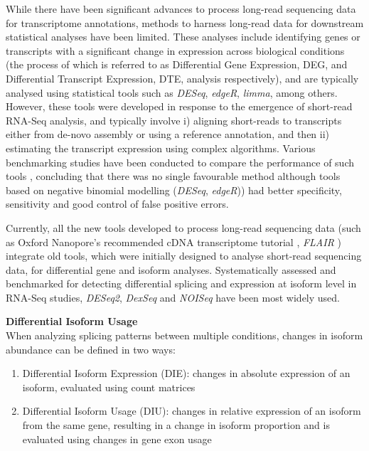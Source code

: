 While there have been significant advances to process long-read sequencing data for transcriptome annotations, methods to harness long-read data for downstream statistical analyses have been limited. These analyses include identifying genes or transcripts with a significant change in expression across biological conditions (the process of which is referred to as Differential Gene Expression, DEG, and Differential Transcript Expression, DTE, analysis respectively), and are typically analysed using statistical tools such as \textit{DESeq}, \textit{edgeR}, \textit{limma}, among others. However, these tools were developed in response to the emergence of short-read RNA-Seq analysis, and typically involve i) aligning short-reads to transcripts either from de-novo assembly or using a reference annotation, and then ii) estimating the transcript expression using complex algorithms. Various benchmarking studies have been conducted to compare the performance of such tools \cite{Teng2016,Rapaport2013}, concluding that there was no single favourable method although tools based on negative binomial modelling (\textit{DESeq}, \textit{edgeR})) had better specificity, sensitivity and good control of false positive errors\cite{Rapaport2013}. 


Currently, all the new tools developed to process long-read sequencing data (such as Oxford Nanopore's recommended cDNA transcriptome tutorial \cite{ONTcdna_transcriptome}, \textit{FLAIR} \cite{Tang2020}) integrate old tools, which were initially designed to analyse short-read sequencing data, for differential gene and isoform analyses. Systematically assessed and benchmarked for detecting differential splicing and expression at isoform level in RNA-Seq studies, \textit{DESeq2}, \textit{DexSeq} and \textit{NOISeq} have been most widely used. 
 

\textbf{Differential Isoform Usage }\\
\label{intro:dtu}
When analyzing splicing patterns between multiple conditions, changes in isoform abundance can be defined in two ways: 
\begin{enumerate}
	\item Differential Isoform Expression (DIE): changes in absolute expression of an isoform, evaluated using count matrices 
	\item Differential Isoform Usage (DIU): changes in relative expression of an isoform from the same gene, resulting in a change in isoform proportion and is evaluated using changes in gene exon usage	
\end{enumerate}

